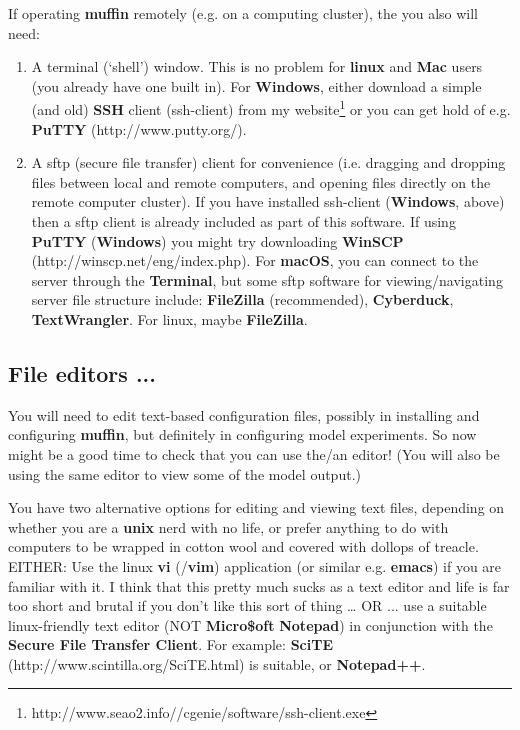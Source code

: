 \documentclass[11pt,fleqn]{book} %
\begin{document}
\noindent If operating \textbf{muffin} remotely (e.g. on a computing cluster), the you also will need:

\begin{enumerate}[noitemsep]
\setlength{\itemindent}{.2in}
\item A terminal (‘shell’) window. This is no problem for \textbf{linux} and \textbf{Mac} users (you already have one built in). For \textbf{Windows}, either download a simple (and old) \textbf{SSH} client (ssh-client) from my website\footnote{http://www.seao2.info//cgenie/software/ssh-client.exe} or you can get hold of e.g. \textbf{PuTTY} (http://www.putty.org/).
\item A sftp (secure file transfer) client for convenience (i.e. dragging and dropping files between local and remote computers, and opening files directly on the remote computer cluster). If you have installed ssh-client (\textbf{Windows}, above) then a sftp client is already included as part of this software. If using \textbf{PuTTY} (\textbf{Windows}) you might try downloading \textbf{WinSCP} (http://winscp.net/eng/index.php). For \textbf{macOS}, you can connect to the server through the \textbf{Terminal}, but some sftp software for viewing/navigating server file structure include: \textbf{FileZilla} (recommended), \textbf{Cyberduck}, \textbf{TextWrangler}. For linux, maybe \textbf{FileZilla}.
\end{enumerate}


\subsection*{File editors ...}

You will need to edit text-based configuration files, possibly in installing and configuring \textbf{muffin}, but definitely in configuring model experiments. So now might be a good time to check that you can use the/an editor! (You will also be using the same editor to view some of the model output.)

You have two alternative options for editing and viewing text files, depending on whether you are a \textbf{unix} nerd with no life, or prefer anything to do with computers to be wrapped in cotton wool and covered with dollops of treacle.
EITHER: Use the linux \textbf{vi} (/\textbf{vim}) application (or similar e.g. \textbf{emacs}) if you are familiar with it. I think that this pretty much sucks as a text editor and life is far too short and brutal if you don't like this sort of thing … OR ... use a suitable linux-friendly text editor (NOT \textbf{Micro\$oft} \textbf{Notepad}) in conjunction with the \textbf{Secure File Transfer Client}. For example: \textbf{SciTE} (http://www.scintilla.org/SciTE.html) is suitable, or \textbf{Notepad++}.
\end{document}
